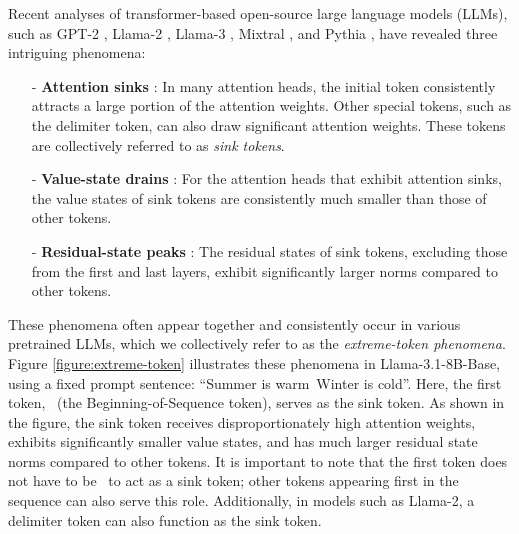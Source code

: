 Recent analyses of transformer-based open-source large language models (LLMs), such as GPT-2 \citep{radford2019language}, Llama-2 \citep{touvron2023llama}, Llama-3 \citep{dubey2024llama}, Mixtral \citep{jiang2023mistral}, and Pythia \citep{biderman2023pythia}, have revealed three intriguing phenomena: 
\begin{itemize}[leftmargin=2em]
\setlength\itemsep{-0.3em}
\item[-] \textbf{Attention sinks} \citep{xiao2023efficient}: In many attention heads, the initial token consistently attracts a large portion of the attention weights. Other special tokens, such as the delimiter token, can also draw significant attention weights. These tokens are collectively referred to as \emph{sink tokens}. 
\item[-] \textbf{Value-state drains} \citep{guo2024attention}: For the attention heads that exhibit attention sinks, the value states of sink tokens are consistently much smaller than those of other tokens. 
\item[-] \textbf{Residual-state peaks} \citep{sun2024massive}: The residual states of sink tokens, excluding those from the first and last layers, exhibit significantly larger norms compared to other tokens. 
\end{itemize}
These phenomena often appear together and consistently occur in various pretrained LLMs, which we collectively refer to as the \emph{extreme-token phenomena}. Figure \ref{figure:extreme-token} illustrates these phenomena in Llama-3.1-8B-Base, using a fixed prompt sentence: “\bos Summer is warm\period~Winter is cold\period”. Here, the first token, \bos~(the Beginning-of-Sequence token), serves as the sink token. As shown in the figure, the sink token receives disproportionately high attention weights, exhibits significantly smaller value states, and has much larger residual state norms compared to other tokens. It is important to note that the first token does not have to be \bos~to act as a sink token; other tokens appearing first in the sequence can also serve this role. Additionally, in models such as Llama-2, a delimiter token can also function as the sink token. 


